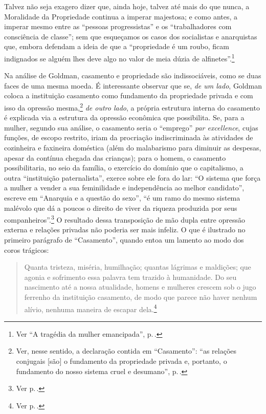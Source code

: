 Talvez não seja exagero
dizer que, ainda hoje, talvez até mais do que nunca, a Moralidade da
Propriedade continua a imperar majestosa; e como antes, a imperar mesmo
entre as ``pessoas progressistas'' e os ``trabalhadores com consciência
de classe''; sem que esqueçamos os casos dos socialistas e anarquistas
que, embora defendam a ideia de que a ``propriedade é um roubo, ficam indignados se
alguém lhes deve algo no valor de meia dúzia de alfinetes''.\footnote{Ver ``A tragédia da mulher emancipada'', p.\,\pageref{alfinete}.}

Na análise de Goldman, casamento e propriedade são indissociáveis, como
se duas faces de uma mesma moeda. É interessante observar que se,
\emph{de um lado}, Goldman coloca a instituição casamento como
fundamento da propriedade privada e com isso da opressão mesma,\footnote{Ver,
nesse sentido, a declaração contida em ``Casamento'': ``as relações
conjugais {[}são{]} o fundamento da propriedade privada e, portanto, o
fundamento do nosso sistema cruel e desumano'', p.\,\pageref{cruel}.} \emph{de outro lado},
a própria estrutura interna do casamento é explicada via a estrutura da
opressão econômica que possibilita. Se, para a mulher, segundo sua
análise, o casamento seria o ``emprego'' \emph{par excellence}, cujas
funções, de escopo restrito, iriam da procriação indiscriminada
às atividades de cozinheira e faxineira doméstica (além do
malabarismo para diminuir as despesas, apesar da contínua chegada das
crianças); para o homem, o casamento possibilitaria, no seio da família,
o exercício do domínio que o capitalismo, a outra ``instituição
paternalista'', exerce sobre ele fora do lar: ``O sistema que
força a mulher a vender a sua feminilidade e independência ao melhor
candidato'', escreve em ``Anarquia e a questão do sexo'', ``é um ramo do
mesmo sistema malévolo que dá a poucos o direito de viver da riqueza
produzida por seus companheiros''.\footnote{Ver p.\,\pageref{sistema}.} O resultado dessa transposição de mão
dupla entre opressão externa e relações privadas não poderia ser mais
infeliz. O que é ilustrado no primeiro parágrafo de ``Casamento'',
quando entoa um lamento ao modo dos coros trágicos:

\begin{quote}
Quanta tristeza, miséria, humilhação; quantas lágrimas e maldições; que
agonia e sofrimento essa palavra tem trazido à humanidade. Do seu
nascimento até a nossa atualidade, homens e mulheres crescem sob o jugo
ferrenho da instituição casamento, de modo que parece não haver nenhum
alívio, nenhuma maneira de escapar dela.\footnote{Ver p.\,\pageref{casamento}.}
\end{quote}

